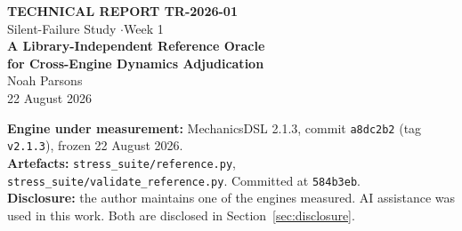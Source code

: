 \documentclass[11pt,a4paper]{article}
\newcommand{\gitsha}[1]{\texttt{#1}}
\begin{document}
\begin{titlepage}
\centering
\vspace*{2.5cm}
{\footnotesize\bfseries TECHNICAL REPORT TR-2026-01}\\[0.4em]
{\footnotesize Silent-Failure Study \quad$\cdot$\quad Week 1}\\[2.2cm]
{\LARGE\bfseries A Library-Independent Reference Oracle\\[0.35em]
 for Cross-Engine Dynamics Adjudication}\\[1.6cm]
{\large Noah Parsons}\\[0.6cm]
{\normalsize 22 August 2026}\\[2.2cm]
\begin{minipage}{0.82\textwidth}
\small
\textbf{Engine under measurement:} MechanicsDSL 2.1.3, commit \gitsha{a8dc2b2}
(tag \texttt{v2.1.3}), frozen 22 August 2026.\\[0.4em]
\textbf{Artefacts:} \texttt{stress\_suite/reference.py},
\texttt{stress\_suite/validate\_reference.py}. Committed at \gitsha{584b3eb}.\\[0.4em]
\textbf{Disclosure:} the author maintains one of the engines measured. AI
assistance was used in this work. Both are disclosed in
Section~\ref{sec:disclosure}.
\end{minipage}
\vfill
\end{titlepage}

\begin{abstract}
\noindent
The silent-failure study compares three dynamics engines on the same mechanical
systems, and adjudicates disagreement with an independent derivation of the
equations of motion. The existing oracle is built on
\texttt{sympy.physics.mechanics}, which is adequate while MechanicsDSL is the
only engine under test but becomes near-circular once SymPy itself is a
contestant. This report describes a replacement oracle derived in closed form
using \texttt{numpy} alone, sharing no library with any engine under test. The
reference reproduces the equations of motion of all three portable test
families, is validated by eleven internal consistency checks, and agrees with
both the existing SymPy oracle and with MechanicsDSL to machine precision
($\leq 5.5\times10^{-15}$ relative) across every case both engines can compute.
Independent adjudication coverage rises from 22 to 31 of the suite's 55 cases,
and for the first time extends to the Hamiltonian pathway. The report also
records a false positive encountered during validation --- an apparent silent
failure of magnitude $4.53$ that proved to be a state-convention mismatch ---
together with the diagnostic that distinguished it, since the same trap is
latent in the existing harness. Three incidental findings about the study's
scope and about the engine's scaling behaviour are documented in
Section~\ref{sec:incidental}.
\end{abstract}
\end{document}
